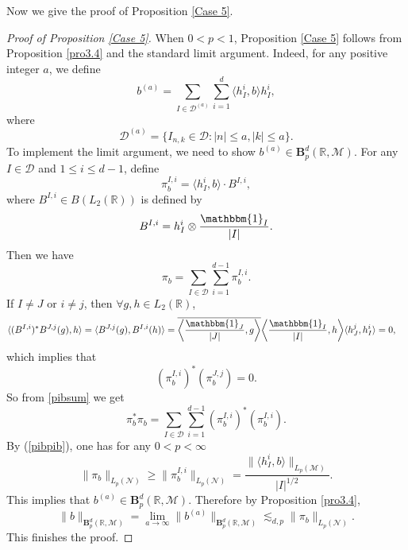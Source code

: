 \documentclass[oneside,english,a4wide]{amsart}
\numberwithin{equation}{section}
\numberwithin{figure}{section}
\theoremstyle{plain}
\theoremstyle{plain}
\theoremstyle{definition}
\theoremstyle{plain}
\theoremstyle{remark}
\theoremstyle{definition}
\theoremstyle{remark}
\theoremstyle{definition}
\newcommand{\8}{\infty}
\begin{document}
Now we give the proof of Proposition \ref{Case 5}.
\begin{proof}[Proof of Proposition \ref{Case 5}]
	When $0<p<1$, Proposition \ref{Case 5} follows from Proposition \ref{pro3.4} and the standard limit argument. Indeed, for any positive integer $a$, we define
	\begin{equation*}
		b^{(a)}=\sum_{I\in \mathcal{D}^{(a)}}\sum_{i=1}^d\langle h_I^i,b\rangle h_I^i,
	\end{equation*}
	where
	\[\mathcal{D}^{(a)}=\{I_{n,k}\in\mathcal{D}:|n|\le a, |k|\le a\}.\]
	To implement the limit argument, we need to show $b^{(a)}\in {\pmb{B}^d_p(\mathbb{R},\mathcal{M})}$. For any $I\in \mathcal{ D}$ and $1\leq i\leq d-1$, define 
	\begin{equation}\label{pibii}
		\pi_b^{I,i}=\langle h_I^i,b\rangle\cdot B^{I,i},
	\end{equation}
	where $B^{I,i}\in B(L_2(\mathbb{R}))$ is defined by
	\begin{equation}\label{Bii}
		B^{I,i}=h_I^i\otimes\frac{\mathbbm{1}_I}{|I|}.
	\end{equation}	
	Then we have
	\begin{equation}\label{pibsum}
		\pi_b=\sum_{I\in \mathcal{D}}\sum_{i=1}^{d-1}\pi_b^{I,i}.
	\end{equation}	
	If $I\neq J$ or $i\neq j$, then $\forall g, h\in L_2(\mathbb{R})$,
	\begin{equation*}
		\begin{aligned}
			\langle (B^{I,i})^*B^{J,j}(g), h\rangle{}&=\langle B^{J,j}(g), B^{I,i}(h)\rangle=\overline{\biggl\langle \frac{\mathbbm{1}_J}{|J|},g\biggr\rangle}\biggl\langle \frac{\mathbbm{1}_I}{|I|},h\biggr\rangle\langle h_J^j,h_I^i\rangle=0,
		\end{aligned}
	\end{equation*}	
	which implies that  
	\begin{equation}\label{pibiijj}
		(\pi_b^{I,i})^*(\pi_b^{J,j})=0.
	\end{equation}
	So from \eqref{pibsum} we get
	\begin{equation}\label{pibpib}
		\pi_b^*\pi_b=\sum_{I\in\mathcal{ D}}\sum_{i=1}^{d-1}(\pi_b^{I,i})^*(\pi_b^{I,i}).
	\end{equation}	 
	By (\ref{pibpib}), one has for any $0<p<\8$
	$$  	\|\pi_{b}\|_{L_p(\mathcal{N})} \geq 	\|\pi_{b}^{I, i}\|_{L_p(\mathcal{N})}=\frac{\|\langle h^i_I,b\rangle\|_{L_p(\mathcal{M})}}{|I|^{1/2}}. $$
	This implies that $b^{(a)}\in {\pmb{B}^d_p(\mathbb{R},\mathcal{M})}$. Therefore by Proposition \ref{pro3.4},
	\[\|b\|_{\pmb{B}^d_p(\mathbb{R},\mathcal{M})}=\lim_{a\to \infty}\|b^{(a)}\|_{\pmb{B}^d_p(\mathbb{R},\mathcal{M})}\lesssim_{d,p} \|\pi_b\|_{L_p(\mathcal{N})}.\]
	This finishes the proof.
\end{proof}
\end{document}
